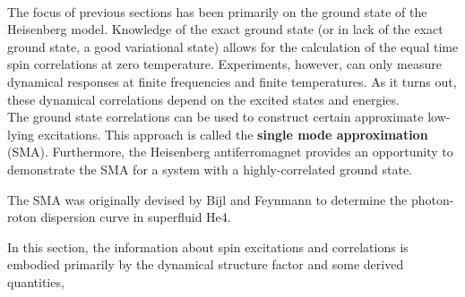 \blanky \\

\begin{tcolorbox}[colback =yellow, title = Physical Context]

The focus of previous sections has  been primarily on the ground state of the Heisenberg model. Knowledge of the exact ground state (or in lack of the exact ground state, a good variational state) allows for the calculation of the equal time spin correlations at zero temperature. Experiments, however, can only measure dynamical responses at finite frequencies and finite temperatures. As it turns out, these dynamical correlations depend on the excited states and energies. \\

The ground state correlations can be used to construct certain approximate low-lying excitations. This approach is called the \textbf{single mode approximation} (SMA). Furthermore, the Heisenberg antiferromagnet provides an opportunity to demonstrate the SMA for a system with a highly-correlated ground state. 

\end{tcolorbox}

\begin{tcolorbox}[colback = LimeGreen, title = Historical Context]

The SMA was originally devised by Bijl and Feynmann  to determine the photon-roton dispersion curve in superfluid He4.

\end{tcolorbox}

In this section, the information about spin excitations and correlations is embodied primarily by the dynamical structure factor and some derived quantities, 

